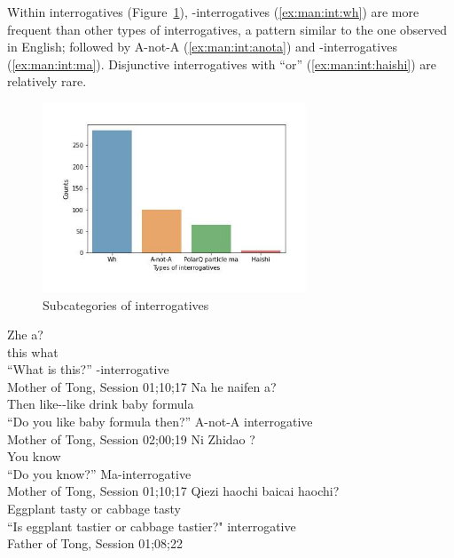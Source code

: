 Within interrogatives (Figure~\ref{fig:man:real-subint}), \twh-interrogatives (\ref{ex:man:int:wh}) are more frequent than other types of interrogatives, a pattern similar to the one observed in English; followed by A-not-A (\ref{ex:man:int:anota}) and -interrogatives (\ref{ex:man:int:ma}). Disjunctive interrogatives with  ``or'' (\ref{ex:man:int:haishi}) are relatively rare. 
\begin{figure}[H]
    \centering
    \includegraphics[width=0.7\textwidth]{figures/man-real-subint.jpg}
    \caption{Subcategories of interrogatives}
    \label{fig:man:real-subint}
\end{figure}

\bxl\label{ex:man:int:wh}
\gll Zhe  a?\\
this what \Sfp{}\\
``What is this?'' \hfill  \twh-interrogative\\Mother of Tong, Session 01;10;17
\ex\label{ex:man:int:anota}
\gll Na  he naifen a?\\
Then like-\Neg-like drink {baby formula} \Sfp{}\\
\trans ``Do you like {baby formula} then?'' \hfill A-not-A interrogative\\
Mother of Tong, Session 02;00;19
\ex\label{ex:man:int:ma}
\gll Ni Zhidao ?\\
You know \\
\trans ``Do you know?'' \hfill Ma-interrogative\\Mother of Tong, Session 01;10;17
\ex\label{ex:man:int:haishi}
\gll Qiezi haochi  baicai haochi?\\
Eggplant tasty or cabbage tasty\\
\trans ``Is eggplant tastier or cabbage tastier?"\hfill {} interrogative\\Father of Tong, Session 01;08;22
\exl
\eex

